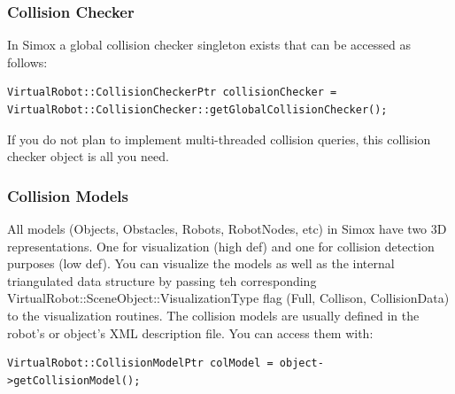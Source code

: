 \subsubsection{Collision Checker}
\par
In Simox a global collision checker singleton exists that can be accessed as follows: 
\begin{lstlisting}
VirtualRobot::CollisionCheckerPtr collisionChecker = VirtualRobot::CollisionChecker::getGlobalCollisionChecker();
\end{lstlisting}
If you do not plan to implement multi-threaded collision queries, this collision checker object is all you need. 
\par
\subsubsection{Collision Models}
All models (Objects, Obstacles, Robots, RobotNodes, etc) in Simox have two 3D representations. One for visualization (high def) and one for collision detection purposes (low def). You can visualize the models as well as the internal triangulated data structure by passing teh corresponding VirtualRobot::SceneObject::VisualizationType flag (Full, Collison, CollisionData) to the visualization routines. The collision models are usually defined in the robot's or object's XML description file. You can access them with: 
\begin{lstlisting}
VirtualRobot::CollisionModelPtr colModel = object->getCollisionModel();
\end{lstlisting}
